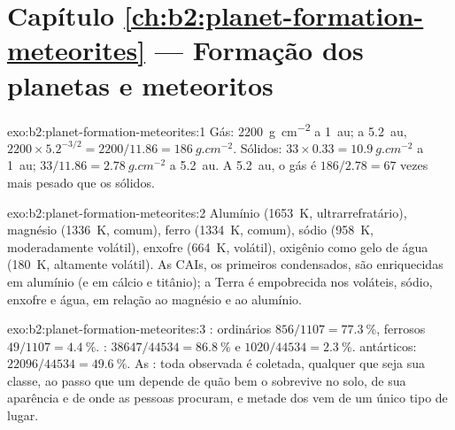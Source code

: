 \section*{Capítulo \ref{ch:b2:planet-formation-meteorites} --- Formação dos planetas e meteoritos}

\begin{solution}{exo:b2:planet-formation-meteorites:1}
Gás: \qty{2200}{g.cm^{-2}} a \qty{1}{au}; a \qty{5.2}{au},
$2200\times5.2^{-3/2} = 2200/11.86 = \qty{186}{g.cm^{-2}}$. Sólidos:
$33\times0.33 = \qty{10.9}{g.cm^{-2}}$ a \qty{1}{au};
$33/11.86 = \qty{2.78}{g.cm^{-2}}$ a \qty{5.2}{au}. A \qty{5.2}{au}, o gás é
$186/2.78 = 67$ vezes mais pesado que os sólidos.
\end{solution}

\begin{solution}{exo:b2:planet-formation-meteorites:2}
Alumínio (\qty{1653}{K}, ultrarrefratário), magnésio (\qty{1336}{K}, comum),
ferro (\qty{1334}{K}, comum), sódio (\qty{958}{K}, moderadamente volátil), enxofre
(\qty{664}{K}, volátil), oxigênio como gelo de água (\qty{180}{K}, altamente volátil).
As CAIs, os primeiros condensados, são enriquecidas em alumínio (e em cálcio e titânio);
a Terra é empobrecida nos voláteis, sódio, enxofre e água, em relação ao
magnésio e ao alumínio.
\end{solution}

\begin{solution}{exo:b2:planet-formation-meteorites:3}
:  ordinários $856/1107 = \qty{77.3}{\percent}$, ferrosos
$49/1107 = \qty{4.4}{\percent}$. : $38647/44534 = \qty{86.8}{\percent}$ e
$1020/44534 = \qty{2.3}{\percent}$.  antárticos: $22096/44534 =
\qty{49.6}{\percent}$. As : toda  observada é coletada, qualquer que seja sua
classe, ao passo que um  depende de quão bem o  sobrevive no solo,
de sua aparência e de onde as pessoas procuram, e metade dos  vem de um único tipo de
lugar.
\end{solution}

